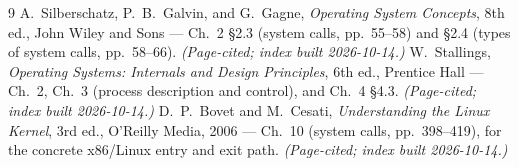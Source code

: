 \documentclass[11pt]{article}
\begin{document}
\begin{thebibliography}{9}
A.~Silberschatz, P.~B.~Galvin, and G.~Gagne, \emph{Operating System Concepts},
8th ed., John Wiley and Sons --- Ch.~2 \S2.3 (system calls, pp.~55--58) and
\S2.4 (types of system calls, pp.~58--66). \emph{(Page-cited; index built
2026-10-14.)}
W.~Stallings, \emph{Operating Systems: Internals and Design Principles}, 6th
ed., Prentice Hall --- Ch.~2, Ch.~3 (process description and control), and
Ch.~4 \S4.3. \emph{(Page-cited; index built 2026-10-14.)}
D.~P.~Bovet and M.~Cesati, \emph{Understanding the Linux Kernel}, 3rd ed.,
O'Reilly Media, 2006 --- Ch.~10 (system calls, pp.~398--419), for the concrete
x86/Linux entry and exit path. \emph{(Page-cited; index built 2026-10-14.)}
\end{thebibliography}
\end{document}
